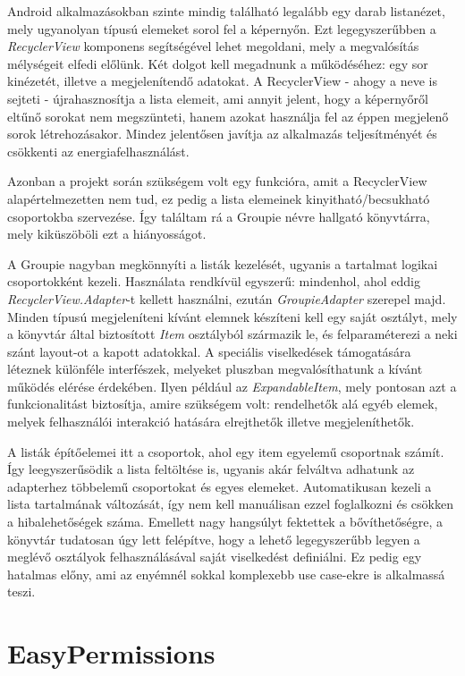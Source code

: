 Android alkalmazásokban szinte mindig található legalább egy darab listanézet, mely ugyanolyan típusú elemeket sorol fel a képernyőn. Ezt legegyszerűbben a \emph{RecyclerView} komponens segítségével lehet megoldani, mely a megvalósítás mélységeit elfedi előlünk. Két dolgot kell megadnunk a működéséhez: egy sor kinézetét, illetve a megjelenítendő adatokat. A RecyclerView - ahogy a neve is sejteti - újrahasznosítja a lista elemeit, ami annyit jelent, hogy a képernyőről eltűnő sorokat nem megszünteti, hanem azokat használja fel az éppen megjelenő sorok létrehozásakor. Mindez jelentősen javítja az alkalmazás teljesítményét és csökkenti az energiafelhasználást. \cite{RecyclerView}

Azonban a projekt során szükségem volt egy funkcióra, amit a RecyclerView alapértelmezetten nem tud, ez pedig a lista elemeinek kinyitható/becsukható csoportokba szervezése. Így találtam rá a Groupie névre hallgató könyvtárra, mely kiküszöböli ezt a hiányosságot.

A Groupie nagyban megkönnyíti a listák kezelését, ugyanis a tartalmat logikai csoportokként kezeli. \cite{Groupie} Használata rendkívül egyszerű: mindenhol, ahol eddig \emph{RecyclerView.Adapter}-t kellett használni, ezután \emph{GroupieAdapter} szerepel majd. Minden típusú megjeleníteni kívánt elemnek készíteni kell egy saját osztályt, mely a könyvtár által biztosított \emph{Item} osztályból származik le, és felparaméterezi a neki szánt layout-ot a kapott adatokkal. A speciális viselkedések támogatására léteznek különféle interfészek, melyeket pluszban megvalósíthatunk a kívánt működés elérése érdekében. Ilyen például az \emph{ExpandableItem}, mely pontosan azt a funkcionalitást biztosítja, amire szükségem volt: rendelhetők alá egyéb elemek, melyek felhasználói interakció hatására elrejthetők illetve megjeleníthetők.

A listák építőelemei itt a csoportok, ahol egy item egyelemű csoportnak számít. Így leegyszerűsödik a lista feltöltése is, ugyanis akár felváltva adhatunk az adapterhez többelemű csoportokat és egyes elemeket. Automatikusan kezeli a lista tartalmának változását, így nem kell manuálisan ezzel foglalkozni és csökken a hibalehetőségek száma. Emellett nagy hangsúlyt fektettek a bővíthetőségre, a könyvtár tudatosan úgy lett felépítve, hogy a lehető legegyszerűbb legyen a meglévő osztályok felhasználásával saját viselkedést definiálni. Ez pedig egy hatalmas előny, ami az enyémnél sokkal komplexebb use case-ekre is alkalmassá teszi.

\section{EasyPermissions}

